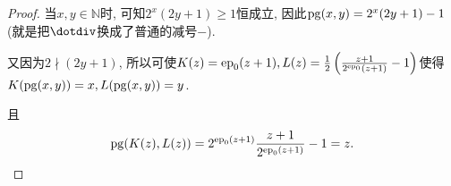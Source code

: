 \begin{proof}
    当$x,y\in\mathbb{N}$时, 可知$2^x(2y+1)\geqslant 1$恒成立, 因此$\mathrm{pg}(x,y)=2^x(2y+1)-1$(就是把$\dotdiv$换成了普通的减号$-$).

    又因为$2\nmid (2y+1)$, 所以可使$K(z)=\mathrm{ep}_0(z+1),L(z)=\frac12\left(\frac{z+1}{2^{\mathrm{ep}_0}(z+1)}-1\right)$使得$K(\mathrm{pg}(x,y))=x,L(\mathrm{pg}(x,y))=y$.

    且$$\mathrm{pg}(K(z),L(z))=2^{\mathrm{ep}_0(z+1)}\frac{z+1}{2^{\mathrm{ep}_0(z+1)}}-1=z.$$
\end{proof}
